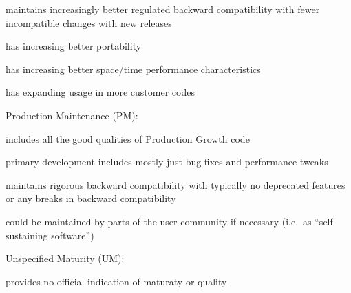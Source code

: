 \documentclass[11pt]{SANDreport}
\begin{document}
\begin{compactenum}
\begin{compactitem}
{}\item maintains increasingly better regulated backward compatibility
with fewer incompatible changes with new releases

{}\item has increasing better portability

{}\item has increasing better space/time performance characteristics

{}\item has expanding usage in more customer codes

\end{compactitem}

{}\item Production Maintenance (PM):

\begin{compactitem}

{}\item includes all the good qualities of Production Growth code

{}\item primary development includes mostly just bug fixes and
performance tweaks

{}\item maintains rigorous backward compatibility with typically no
deprecated features or any breaks in backward compatibility

{}\item could be maintained by parts of the user community if
necessary (i.e.\ as ``self-sustaining software'')

\end{compactitem}

{}\item Unspecified Maturity (UM):

\begin{compactitem}

{}\item provides no official indication of maturaty or quality

\end{compactitem}

\end{compactenum}
\end{document}
